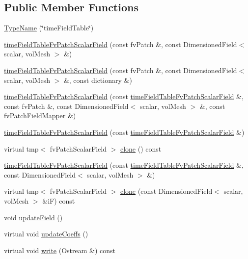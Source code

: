 \subsection*{Public Member Functions}
\begin{DoxyCompactItemize}
\item 
\hyperlink{classFoam_1_1timeFieldTableFvPatchScalarField_ab882b24da82bb70217b737e05a605505}{Type\+Name} (\char`\"{}time\+Field\+Table\char`\"{})
\item 
\hyperlink{classFoam_1_1timeFieldTableFvPatchScalarField_a4ade1111be05100951053569ae4587bd}{time\+Field\+Table\+Fv\+Patch\+Scalar\+Field} (const fv\+Patch \&, const Dimensioned\+Field$<$ scalar, vol\+Mesh $>$ \&)
\item 
\hyperlink{classFoam_1_1timeFieldTableFvPatchScalarField_a261950c1ce59b7244bb7ed5f4b9af400}{time\+Field\+Table\+Fv\+Patch\+Scalar\+Field} (const fv\+Patch \&, const Dimensioned\+Field$<$ scalar, vol\+Mesh $>$ \&, const dictionary \&)
\item 
\hyperlink{classFoam_1_1timeFieldTableFvPatchScalarField_a4db9c747809c379bb24ac268fd73faa8}{time\+Field\+Table\+Fv\+Patch\+Scalar\+Field} (const \hyperlink{classFoam_1_1timeFieldTableFvPatchScalarField}{time\+Field\+Table\+Fv\+Patch\+Scalar\+Field} \&, const fv\+Patch \&, const Dimensioned\+Field$<$ scalar, vol\+Mesh $>$ \&, const fv\+Patch\+Field\+Mapper \&)
\item 
\hyperlink{classFoam_1_1timeFieldTableFvPatchScalarField_a0f8671cc824a6cb944e6628cf4520776}{time\+Field\+Table\+Fv\+Patch\+Scalar\+Field} (const \hyperlink{classFoam_1_1timeFieldTableFvPatchScalarField}{time\+Field\+Table\+Fv\+Patch\+Scalar\+Field} \&)
\item 
virtual tmp$<$ fv\+Patch\+Scalar\+Field $>$ \hyperlink{classFoam_1_1timeFieldTableFvPatchScalarField_abeb5f251f04d334f7f18704c9227d8aa}{clone} () const
\item 
\hyperlink{classFoam_1_1timeFieldTableFvPatchScalarField_a8f731ceef929b064fc7d18295f42523f}{time\+Field\+Table\+Fv\+Patch\+Scalar\+Field} (const \hyperlink{classFoam_1_1timeFieldTableFvPatchScalarField}{time\+Field\+Table\+Fv\+Patch\+Scalar\+Field} \&, const Dimensioned\+Field$<$ scalar, vol\+Mesh $>$ \&)
\item 
virtual tmp$<$ fv\+Patch\+Scalar\+Field $>$ \hyperlink{classFoam_1_1timeFieldTableFvPatchScalarField_a617bc55e78cf53196df9217431e5aa96}{clone} (const Dimensioned\+Field$<$ scalar, vol\+Mesh $>$ \&iF) const
\item 
void \hyperlink{classFoam_1_1timeFieldTableFvPatchScalarField_acc39815ad4f05c1b142510d19aa42dde}{update\+Field} ()
\item 
virtual void \hyperlink{classFoam_1_1timeFieldTableFvPatchScalarField_a7e24eafac629d3733181cd942d4c902f}{update\+Coeffs} ()
\item 
virtual void \hyperlink{classFoam_1_1timeFieldTableFvPatchScalarField_a293fdfec8bdfbd5c3913ab4c9f3454ff}{write} (Ostream \&) const
\end{DoxyCompactItemize}


